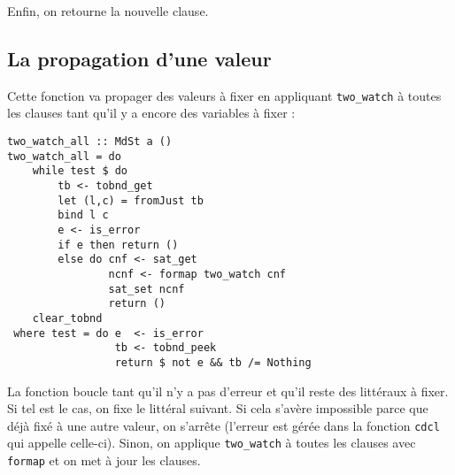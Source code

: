 Enfin, on retourne la nouvelle clause.

\subsection{La propagation d'une valeur}
Cette fonction va propager des valeurs à fixer en appliquant
\texttt{two\_watch} à toutes les clauses tant qu'il y a encore des variables à
fixer :
\begin{lstlisting}
two_watch_all :: MdSt a ()
two_watch_all = do
    while test $ do
        tb <- tobnd_get
        let (l,c) = fromJust tb
        bind l c
        e <- is_error
        if e then return ()
        else do cnf <- sat_get
                ncnf <- formap two_watch cnf
                sat_set ncnf
                return ()
    clear_tobnd
 where test = do e  <- is_error
                 tb <- tobnd_peek
                 return $ not e && tb /= Nothing
\end{lstlisting}%

La fonction boucle tant qu'il n'y a pas d'erreur et qu'il reste des littéraux
à fixer. Si tel est le cas, on fixe le littéral suivant. Si cela s'avère
impossible parce que déjà fixé à une autre valeur, on s'arrête (l'erreur est
gérée dans la fonction \texttt{cdcl} qui appelle celle-ci). Sinon, on applique
\texttt{two\_watch} à toutes les clauses avec \texttt{formap} et on met à jour
les clauses.

